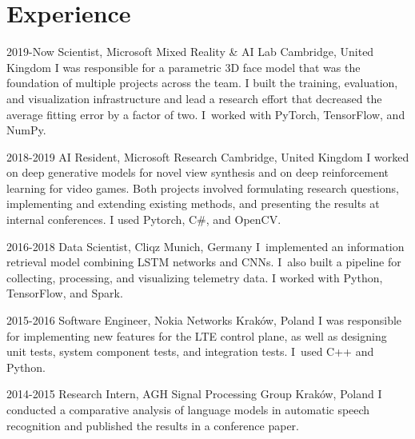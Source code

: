 \documentclass[]{friggeri-cv_osx}
\begin{document}
\vspace{5mm}
\begin{center}
\href{https://sebastiandziadzio.com}{\color{gray} \Large \faHome} \hspace{0.05cm}
\href{https://github.com/sebastiandziadzio}{\color{gray} \Large \faGithub} \hspace{0.05cm}
\href{https://twitter.com/sebadzia}{\color{gray} \Large\faTwitter} \hspace{0.05cm}
\href{https://pl.linkedin.com/in/sebastiandziadzio}{\color{gray} \Large\faLinkedin} \hspace{0.05cm}
\href{https://scholar.google.com/citations?user=8vAIQXoAAAAJ&hl=en}{\color{gray} \Large\faGraduationCap} \hspace{0.05cm}
\end{center}
\vspace{2mm}

\section{Experience}
\begin{entrylist}
\entry
{2019-Now}
{Scientist, Microsoft Mixed Reality \& AI Lab}
{Cambridge, United Kingdom}
{I was responsible for a parametric 3D face model that was the foundation of multiple projects across the team. I built the training, evaluation, and visualization infrastructure
and lead a research effort that decreased the average fitting error by a factor of two. I~worked with PyTorch, TensorFlow, and NumPy.\\}

\entry
{2018-2019}
{AI Resident, Microsoft Research}
{Cambridge, United Kingdom}
{I worked on deep generative models for novel view synthesis and on deep reinforcement learning for video games. Both projects involved
formulating research questions, implementing and extending existing methods, and presenting the results at internal conferences. I used Pytorch, C\#, and OpenCV.\\}

\entry
{2016-2018}
{Data Scientist, Cliqz}
{Munich, Germany}
{I~implemented an information retrieval model combining LSTM networks and CNNs. I~also built a pipeline for
collecting, processing, and visualizing telemetry data. I worked with Python, TensorFlow, and Spark.\\}

\entry
{2015-2016}
{Software Engineer, Nokia Networks}
{Kraków, Poland}
{I was responsible for implementing new features for the LTE control plane, as well as designing unit tests, system component tests,
and integration tests. I~used C++ and Python.\\}

\entry
{2014-2015}
{Research Intern, AGH Signal Processing Group}
{Kraków, Poland}
{I conducted a comparative analysis of language models in automatic speech recognition and published the results in a conference paper.\\}
\end{entrylist}
\end{document}
